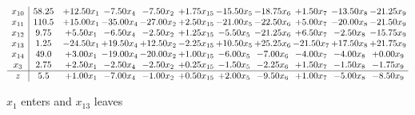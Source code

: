\documentclass[9pt]{article}
\begin{document}
 \[\begin{array}{c| c c@{\hskip 2pt} c@{\hskip 2pt} c@{\hskip 2pt} c@{\hskip 2pt} c@{\hskip 2pt} c@{\hskip 2pt} c@{\hskip 2pt} c@{\hskip 2pt} c@{\hskip 2pt} }
 x_{10}   &  58.25 & + 12.50 x_{1} & -7.50 x_{4} & -7.50 x_{2} & +  1.75 x_{15} & -15.50 x_{5} & -18.75 x_{6} & +  1.50 x_{7} & -13.50 x_{8} & -21.25 x_{9}\\
 x_{11}   &  110.5 & + 15.00 x_{1} & -35.00 x_{4} & -27.00 x_{2} & +  2.50 x_{15} & -21.00 x_{5} & -22.50 x_{6} & +  5.00 x_{7} & -20.00 x_{8} & -21.50 x_{9}\\
 x_{12}   &  9.75 & +  5.50 x_{1} & -6.50 x_{4} & -2.50 x_{2} & +  1.25 x_{15} & -5.50 x_{5} & -21.25 x_{6} & +  6.50 x_{7} & -2.50 x_{8} & -15.75 x_{9}\\
 x_{13}   &  1.25 & -24.50 x_{1} & + 19.50 x_{4} & + 12.50 x_{2} & -2.25 x_{15} & + 10.50 x_{5} & + 25.25 x_{6} & -21.50 x_{7} & + 17.50 x_{8} & + 21.75 x_{9}\\
 x_{14}   &  49.0 & +  3.00 x_{1} & -19.00 x_{4} & -20.00 x_{2} & +  1.00 x_{15} & -6.00 x_{5} & -7.00 x_{6} & -4.00 x_{7} & -4.00 x_{8} & +  0.00 x_{9}\\
 x_{3}   &  2.75 & +  2.50 x_{1} & -2.50 x_{4} & -2.50 x_{2} & +  0.25 x_{15} & -1.50 x_{5} & -2.25 x_{6} & +  1.50 x_{7} & -1.50 x_{8} & -1.75 x_{9}\\
\hline
z    &  5.5 & +  1.00 x_{1} & -7.00 x_{4} & -1.00 x_{2} & +  0.50 x_{15} & +  2.00 x_{5} & -9.50 x_{6} & +  1.00 x_{7} & -5.00 x_{8} & -8.50 x_{9}\\
\end{array}\]


 $ x_{1} $ enters and $ x_{13} $ leaves 
\end{document}
